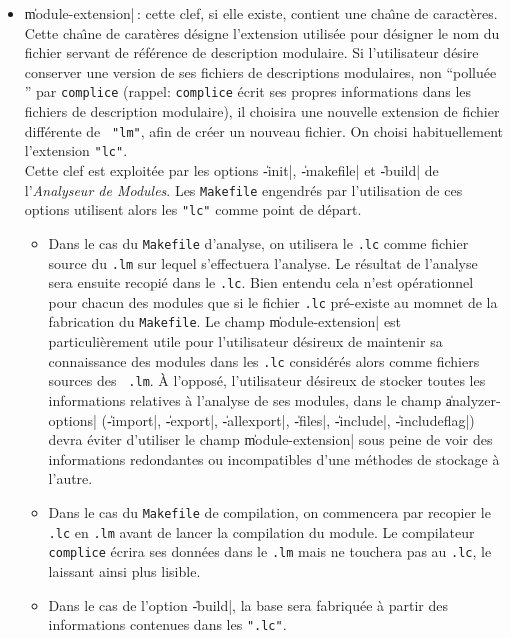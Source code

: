 \begin{itemize}
\item {\Large \|module-extension|}\,: cette clef, si elle existe,
contient une cha\^{\i}ne de caract\`{e}res. Cette cha\^{\i}ne de carat\`{e}res
d\'{e}signe l'extension utilis\'{e}e pour d\'{e}signer le nom du fichier
servant de r\'{e}f\'{e}rence de description modulaire. Si l'utilisateur
d\'{e}sire conserver une version de ses fichiers de descriptions modulaires, non
``pollu\'{e}e {''} par {\tt complice} (rappel: {\tt complice} \'{e}crit ses
propres informations dans les fichiers de description modulaire), il
choisira une nouvelle extension de fichier diff\'{e}rente de {\tt
"lm"}, afin de cr\'{e}er un nouveau fichier. On choisi habituellement
l'extension {\tt "lc"}. \\
Cette clef est exploit\'{e}e par les options \|-init|, \|-makefile| et
\|-build| de l'{\em Analyseur de Modules}.
Les {\tt Makefile} engendr\'{e}s par l'utilisation de ces options utilisent alors
les {\tt "lc"} comme point de d\'{e}part. 
\begin{itemize}
\item Dans le cas du {\tt Makefile}
d'analyse, on utilisera le {\tt .lc} comme fichier source du {\tt .lm}
sur lequel s'effectuera l'analyse. Le r\'{e}sultat de l'analyse sera
ensuite recopi\'{e} dans le {\tt .lc}. Bien entendu cela n'est
op\'{e}rationnel pour chacun des modules que si le fichier {\tt .lc}
pr\'{e}-existe au momnet de la fabrication du {\tt Makefile}.
Le champ \|module-extension| est particuli\`{e}rement utile
pour l'utilisateur d\'{e}sireux de maintenir sa connaissance des modules
dans les {\tt .lc} consid\'{e}r\'{e}s alors comme fichiers sources des {\tt
.lm}. \`{A} l'oppos\'{e}, l'utilisateur d\'{e}sireux de stocker toutes les
informations relatives \`{a} l'analyse de ses modules, dans le champ
\|analyzer-options| (\|-import|, \|-export|, \|-allexport|, \|-files|,
\|-include|, \|-includeflag|) devra \'{e}viter
d'utiliser le champ 
\|module-extension| sous peine de voir des informations redondantes
ou incompatibles d'une
m\'{e}thodes de stockage \`{a} l'autre.

\item Dans le cas du {\tt Makefile} de compilation, on commencera par
recopier le {\tt .lc} en {\tt .lm} avant de lancer la compilation du
module. Le compilateur {\tt complice} \'{e}crira ses donn\'{e}es dans le
{\tt .lm} mais ne touchera pas au {\tt .lc}, le laissant ainsi plus
lisible.

\item Dans le cas de l'option \|-build|, la base sera fabriqu\'{e}e \`{a}
partir des informations contenues dans les {\tt ".lc"}.


\end{itemize}
\end{itemize}
